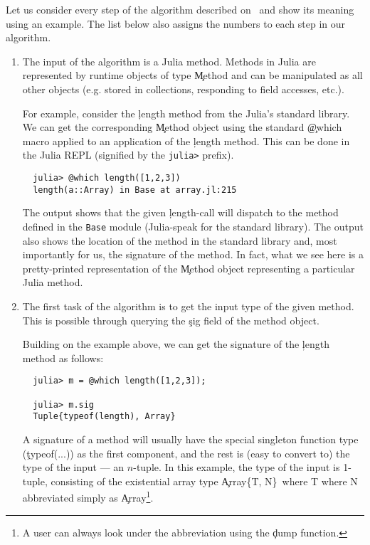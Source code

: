Let us consider every step of the algorithm described
on~ and show its meaning using an example.
The list below also assigns the numbers to each step in our algorithm.
\begin{enumerate}

  \item The input of the algorithm is a Julia method. Methods in Julia are
  represented by runtime objects of type \c{Method} and can be manipulated as
  all other objects (e.g. stored in collections, responding to field accesses, etc.).

  For example, consider the \c{length} method from the Julia's standard library. We can
  get the corresponding \c{Method} object using the standard \c{@which} macro
  applied to an application of the \c{length} method. This can be done in the
  Julia REPL (signified by the \texttt{julia>} prefix).
\begin{verbatim}
  julia> @which length([1,2,3])
  length(a::Array) in Base at array.jl:215
\end{verbatim}

  The output shows that the given \c{length}-call will dispatch to the
  method defined in the \texttt{Base} module (Julia-speak for the standard
  library). The output also shows the location of the method in the
  standard library and, most importantly for us, the signature of the
  method. In fact, what we see here is a pretty-printed representation of
  the \c{Method} object representing a particular Julia method.

  \item The first task of the algorithm is to get the input type of the given
  method. This is possible through querying the \c{sig} field of the method object.

  Building on the example above, we can get the signature of the \c{length}
  method as follows:
\begin{verbatim}
  julia> m = @which length([1,2,3]);

  julia> m.sig
  Tuple{typeof(length), Array}
\end{verbatim}

  A signature of a method will usually have the special singleton function
  type (\c{typeof(...)}) as the first component, and the rest is (easy to
  convert to) the type of the input --- an $n$-tuple. In this example, the type of
  the input is 1-tuple, consisting of the existential array type
  \c{Array\{T, N\}\ where T where N} abbreviated simply as \c{Array}\footnote{%
A user can always look under the abbreviation using the \c{dump} function.
}.


\end{enumerate}
